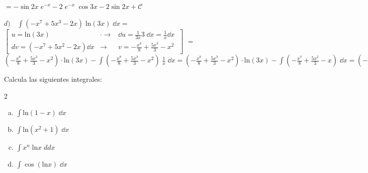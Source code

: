 \begin{proofw}
$= -\sin 2x \; e^{-x} -2 \; e^{-x} \; \cos 3x -2 \sin 2x + \mathcal C$


$d) \quad \displaystyle \int (-x^7+5x^3-2x)\; \mathrm{ln} (3x) \; \dd x = \; $ \footnotesize{$ \left[ \begin{matrix} u=\mathrm{ln} (3x)  &  \cdot \to &  \dd u= \frac 1 {3x}3 \; \dd x = \frac 1 x \dd x \  \\  dv=(-x^7+5x^2-2x) \dd x & \to & v= - \frac {x^8}{8}+ \frac {5x^3}{3}-x^2 \end{matrix} \right] \;$} \normalsize{=} $ (- \frac {x^8}{8}+ \frac {5x^3}{3}-x^2)\cdot   \mathrm{ln} (3x) - \int (- \frac {x^8}{8}+ \frac {5x^3}{3}-x^2) \; \frac 1 x \; \dd x =(- \frac {x^8}{8}+ \frac {5x^3}{3}-x^2)\cdot   \mathrm{ln} (3x) - \int (- \frac {x^7}{8}+ \frac {5x^2}{3}-x) \; \dd x =(- \frac {x^8}{8}+ \frac {5x^3}{3}-x^2)\cdot   \mathrm{ln} (3x) - (- \frac {x^9}{72}+ \frac {5x^4}{12}-\frac {x^2}{2}) + \mathcal C=$
\end{proofw}

\begin{ejre} Calcula las siguientes integrales:
\begin{multicols}{2}
\begin{enumerate}[a) ]
\item $\displaystyle \int \mathrm{ln}(1-x) \; \dd x $
\item $\displaystyle \int \mathrm{ln}(x^2+1) \; \dd x $
\item $\displaystyle \int x^n\; \mathrm{ln}x \; dd x$
\item $\displaystyle \int \cos(\mathrm{ln}x) \; \dd x $	
\end{enumerate}
\end{multicols}
\end{ejre}

